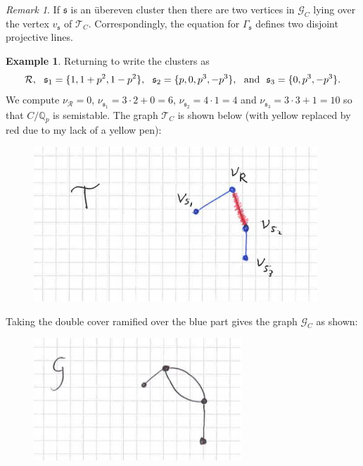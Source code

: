 \documentclass[12pt]{amsart}
\numberwithin{equation}{section}
\theoremstyle{remark}
\newtheorem{remark}[equation]{Remark}
\theoremstyle{definition}
\newtheorem{example}[equation]{Example}
\theoremstyle{definition}
\theoremstyle{definition}
\theoremstyle{definition}
\theoremstyle{definition}
\theoremstyle{definition}
\begin{document}
\begin{remark}
If $\mathfrak{s}$ is an  \"{u}bereven cluster then there are two vertices in $\mathcal{G}_C$ lying over the vertex $v_\mathfrak{s}$ of $\mathcal{T}_C$. Correspondingly, the equation for $\Gamma_\mathfrak{s}$ defines two disjoint projective lines. 
\end{remark}

\begin{example} 
Returning to  write the clusters as 
\[\mathcal{R},~~\mathfrak{s}_1=\{1,1+p^2,1-p^2\},~~\mathfrak{s}_2=\{p,0,p^3,-p^3\},~~\textup{and}~~\mathfrak{s}_3=\{0,p^3,-p^3\}.\]
We compute $\nu_\mathcal{R}=0$, $\nu_{\mathfrak{s}_1}=3\cdot 2+0=6$, $\nu_{\mathfrak{s}_2}=4\cdot 1=4$ and $\nu_{\mathfrak{s}_3}=3\cdot 3+1=10$ so that $C/\mathbb{Q}_p$ is semistable. The graph $\mathcal{T}_C$ is shown below (with yellow replaced by red due to my lack of a yellow pen):
\newpage
\begin{figure} [!htb] 
\includegraphics[angle=0,scale=0.6]{tree}
\end{figure}

Taking the double cover ramified over the blue part gives the graph $\mathcal{G}_C$ as shown:
\begin{figure} [!htb] 
\includegraphics[angle=0,scale=0.6]{hypgraph}
\end{figure}


\end{example}
\end{document}
